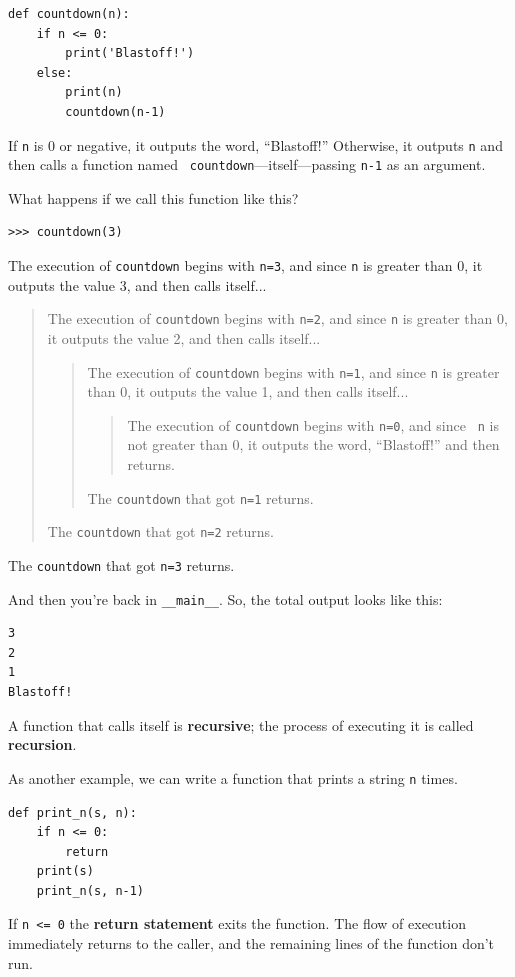\documentclass[10pt]{book}
\begin{document}
\begin{verbatim}
def countdown(n):
    if n <= 0:
        print('Blastoff!')
    else:
        print(n)
        countdown(n-1)
\end{verbatim}
%
If {\tt n} is 0 or negative, it outputs the word, ``Blastoff!''
Otherwise, it outputs {\tt n} and then calls a function named {\tt
countdown}---itself---passing {\tt n-1} as an argument.

What happens if we call this function like this?

\begin{verbatim}
>>> countdown(3)
\end{verbatim}
%
The execution of {\tt countdown} begins with {\tt n=3}, and since
{\tt n} is greater than 0, it outputs the value 3, and then calls itself...

\begin{quote}
The execution of {\tt countdown} begins with {\tt n=2}, and since
{\tt n} is greater than 0, it outputs the value 2, and then calls itself...

\begin{quote}
The execution of {\tt countdown} begins with {\tt n=1}, and since
{\tt n} is greater than 0, it outputs the value 1, and then calls itself...

\begin{quote}
The execution of {\tt countdown} begins with {\tt n=0}, and since {\tt
n} is not greater than 0, it outputs the word, ``Blastoff!'' and then
returns.
\end{quote}

The {\tt countdown} that got {\tt n=1} returns.
\end{quote}

The {\tt countdown} that got {\tt n=2} returns.
\end{quote}

The {\tt countdown} that got {\tt n=3} returns.

And then you're back in \verb"__main__".  So, the
total output looks like this:

\begin{verbatim}
3
2
1
Blastoff!
\end{verbatim}
%
A function that calls itself is {\bf recursive}; the process of
executing it is called {\bf recursion}.

As another example, we can write a function that prints a
string {\tt n} times.

\begin{verbatim}
def print_n(s, n):
    if n <= 0:
        return
    print(s)
    print_n(s, n-1)
\end{verbatim}
%
If {\tt n <= 0} the {\bf return statement} exits the function.  The
flow of execution immediately returns to the caller, and the remaining
lines of the function don't run.
\end{document}
